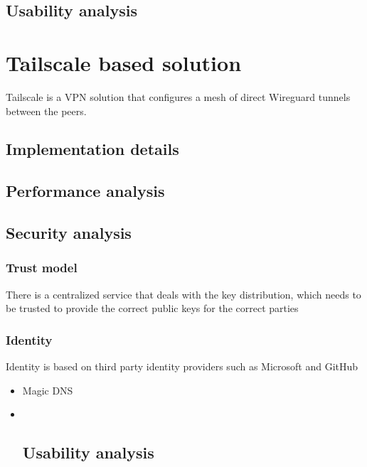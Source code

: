 \section{Usability analysis}\label{thesis__060-wireguard.md__usability-analysis}

\label{thesis__070-tailscale.md}
\chapter{Tailscale based solution}\label{thesis__070-tailscale.md__tailscale-based-solution}

Tailscale is a VPN solution that configures a mesh of direct Wireguard tunnels between the peers.

\section{Implementation details}\label{thesis__070-tailscale.md__implementation-details}

\section{Performance analysis}\label{thesis__070-tailscale.md__performance-analysis}

\section{Security analysis}\label{thesis__070-tailscale.md__security-analysis}

\subsection{Trust model}\label{thesis__070-tailscale.md__trust-model}

There is a centralized service that deals with the key distribution, which needs to be trusted to provide the correct public keys for the correct parties

\subsection{Identity}\label{thesis__070-tailscale.md__identity}

Identity is based on third party identity providers such as Microsoft and GitHub

\begin{itemize}
\item
  Magic DNS
\item ~
  \section{Usability analysis}\label{thesis__070-tailscale.md__usability-analysis}
\end{itemize}

